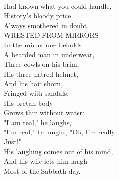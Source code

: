 \documentclass[smalldemyvopaper,11pt,twoside,onecolumn,openright,extrafontsizes]{memoir}
\begin{document}
\\Had known what you could handle,
\\History's bloody price
\\Always smothered in doubt.
\\WRESTED FROM MIRRORS
\\In the mirror one beholds
\\A bearded man in underwear,
\\Three cowls on his brim,
\\His three-hatred helmet,
\\And his hair shorn,
\\Fringed with sandals;
\\His bretan body
\\Grows thin without water:
\\"I am real," he laughs,
\\"I'm real," he laughs, "Oh, I'm really
\\Just!"
\\His laughing comes out of his mind,
\\And his wife lets him laugh
\\Most of the Sabbath day.
\end{document}
